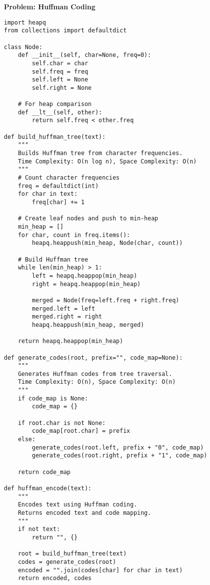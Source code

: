 \noindent\textbf{Problem: Huffman Coding}
\begin{verbatim}
import heapq
from collections import defaultdict

class Node:
    def __init__(self, char=None, freq=0):
        self.char = char
        self.freq = freq
        self.left = None
        self.right = None
        
    # For heap comparison
    def __lt__(self, other):
        return self.freq < other.freq

def build_huffman_tree(text):
    """
    Builds Huffman tree from character frequencies.
    Time Complexity: O(n log n), Space Complexity: O(n)
    """
    # Count character frequencies
    freq = defaultdict(int)
    for char in text:
        freq[char] += 1
    
    # Create leaf nodes and push to min-heap
    min_heap = []
    for char, count in freq.items():
        heapq.heappush(min_heap, Node(char, count))
    
    # Build Huffman tree
    while len(min_heap) > 1:
        left = heapq.heappop(min_heap)
        right = heapq.heappop(min_heap)
        
        merged = Node(freq=left.freq + right.freq)
        merged.left = left
        merged.right = right
        heapq.heappush(min_heap, merged)
    
    return heapq.heappop(min_heap)

def generate_codes(root, prefix="", code_map=None):
    """
    Generates Huffman codes from tree traversal.
    Time Complexity: O(n), Space Complexity: O(n)
    """
    if code_map is None:
        code_map = {}
    
    if root.char is not None:
        code_map[root.char] = prefix
    else:
        generate_codes(root.left, prefix + "0", code_map)
        generate_codes(root.right, prefix + "1", code_map)
    
    return code_map

def huffman_encode(text):
    """
    Encodes text using Huffman coding.
    Returns encoded text and code mapping.
    """
    if not text:
        return "", {}
    
    root = build_huffman_tree(text)
    codes = generate_codes(root)
    encoded = "".join(codes[char] for char in text)
    return encoded, codes
\end{verbatim}

% 
